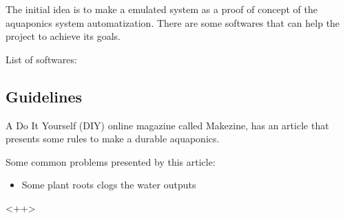 The initial idea is to make a emulated system as a proof of concept of the aquaponics system automatization.
There are some softwares that can help the project to achieve its goals.

List of softwares:


\subsection{Guidelines}
A Do It Yourself (DIY) online magazine called Makezine,
has an article \cite{make_mag_Arquaduinic} that presents some rules to make a durable aquaponics.

Some common problems presented by this article:
\begin{itemize}
    \item Some plant roots clogs the water outputs
\end{itemize}<++>
